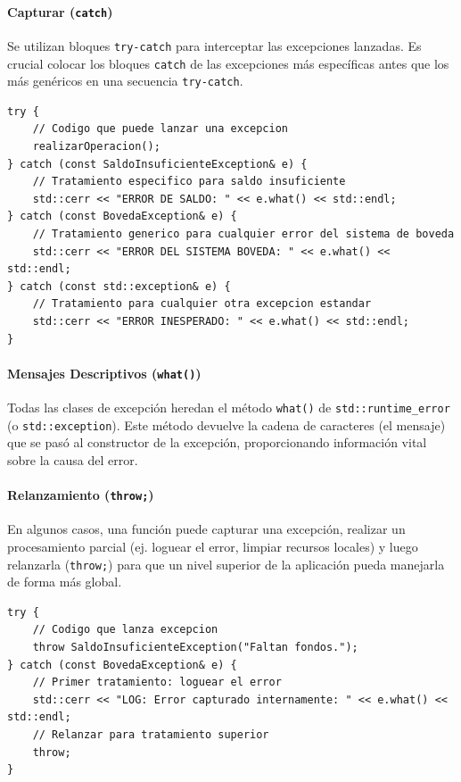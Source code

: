 \documentclass{article}
\newcommand{\inlinecode}[1]{\texttt{#1}}
\begin{document}
\paragraph*{\textbf{Capturar (\inlinecode{catch})}}
Se utilizan bloques \inlinecode{try-catch} para interceptar las excepciones lanzadas. Es crucial colocar los bloques \inlinecode{catch} de las excepciones más específicas antes que los más genéricos en una secuencia \inlinecode{try-catch}.
\begin{lstlisting}
try {
    // Codigo que puede lanzar una excepcion
    realizarOperacion();
} catch (const SaldoInsuficienteException& e) {
    // Tratamiento especifico para saldo insuficiente
    std::cerr << "ERROR DE SALDO: " << e.what() << std::endl;
} catch (const BovedaException& e) {
    // Tratamiento generico para cualquier error del sistema de boveda
    std::cerr << "ERROR DEL SISTEMA BOVEDA: " << e.what() << std::endl;
} catch (const std::exception& e) {
    // Tratamiento para cualquier otra excepcion estandar
    std::cerr << "ERROR INESPERADO: " << e.what() << std::endl;
}
\end{lstlisting}

\paragraph*{\textbf{Mensajes Descriptivos (\inlinecode{what()})}}
Todas las clases de excepción heredan el método \inlinecode{what()} de \inlinecode{std::runtime_error} (o \inlinecode{std::exception}). Este método devuelve la cadena de caracteres (el mensaje) que se pasó al constructor de la excepción, proporcionando información vital sobre la causa del error.

\paragraph*{\textbf{Relanzamiento (\inlinecode{throw;})}}
En algunos casos, una función puede capturar una excepción, realizar un procesamiento parcial (ej. loguear el error, limpiar recursos locales) y luego relanzarla (\inlinecode{throw;}) para que un nivel superior de la aplicación pueda manejarla de forma más global.
\begin{lstlisting}
try {
    // Codigo que lanza excepcion
    throw SaldoInsuficienteException("Faltan fondos.");
} catch (const BovedaException& e) {
    // Primer tratamiento: loguear el error
    std::cerr << "LOG: Error capturado internamente: " << e.what() << std::endl;
    // Relanzar para tratamiento superior
    throw;
}
\end{lstlisting}
\end{document}
